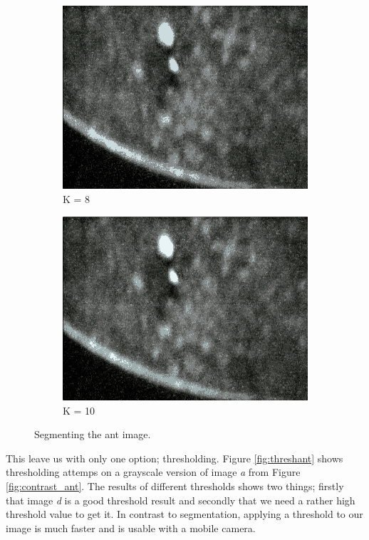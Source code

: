 \begin{figure}
\begin{subfigure}[b]{0.4\textwidth}
                \includegraphics[scale = 0.2]{img/segment8}
                \caption{K = 8}
        \end{subfigure}
		\quad
        \begin{subfigure}[b]{0.4\textwidth}
                \includegraphics[scale = 0.2]{img/segment10}
                \caption{K = 10}
        \end{subfigure}
		\caption{Segmenting the ant image.}
		\label{fig:segment_ant}
\end{figure}

This leave us with only one option; thresholding. Figure \ref{fig:threshant} shows thresholding attemps on a grayscale version of image \emph{a} from Figure \ref{fig:contrast_ant}. The results of different thresholds shows two things; firstly that image \emph{d} is a good threshold result and secondly that we need a rather high threshold value to get it. In contrast to segmentation, applying a threshold to our image is much faster and is usable with a mobile camera.\\

